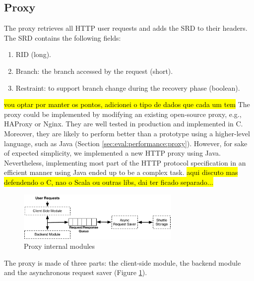 \subsection{Proxy}\label{sec:impl:normal:proxy}
The proxy retrieves all \ac{HTTP} user requests and adds the \ac{SRD} to their headers. The \ac{SRD} contains the following fields:
\begin{enumerate}
	\item \acf{RID} (long).
	\item Branch: the branch accessed by the request (short).
	\item Restraint: to support branch change during the recovery phase (boolean).
\end{enumerate}

\hl{vou optar por manter os pontos, adicionei o tipo de dados que cada um tem} The proxy could be implemented by modifying an existing open-source proxy, e.g., HAProxy or Nginx. They are well tested in production and implemented in C. Moreover, they are likely to perform better than a prototype using a higher-level language, such as Java (Section \ref{sec:eval:performance:proxy}). However, for sake of expected simplicity, we implemented a new \ac{HTTP} proxy using Java. Nevertheless, implementing most part of the \ac{HTTP} protocol specification in an efficient manner using Java ended up to be a complex task. \hl{aqui discuto mas defendendo o C, nao o Scala ou outras libs, dai ter ficado separado...}


\begin{figure}
  \centering
  \includegraphics[width=0.7\textwidth]{arch/proxy}
  \caption{Proxy internal modules}
  \label{fig:impl:proxy_modules}
\end{figure}

The proxy is made of three parts: the client-side module, the backend module and the asynchronous request saver (Figure \ref{fig:impl:proxy_modules}).

